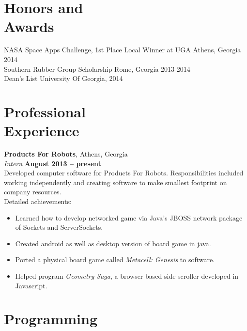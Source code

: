 \documentclass[margin,line]{resume}
\begin{document}
\begin{resume}
    \section{\mysidestyle Honors and\\Awards} 

   NASA Space Apps Challenge, 1st Place Local Winner at UGA \hfill Athens, Georgia 2014\\%
   Southern Rubber Group Scholarship \hfill Rome, Georgia 2013-2014\\%
   Dean's List \hfill University Of Georgia, 2014
   \section{\mysidestyle Professional\\Experience}

    \textbf{Products For Robots}, Athens, Georgia \vspace{2mm}\\\vspace{1mm}%
    \textsl{Intern} \hfill \textbf{August 2013 -- present}\\
   Developed computer software for Products For Robots. Responsibilities included working independently and creating software to make smallest footprint on company resources.\\
Detailed achievements:
\begin{itemize}
\item Learned how to develop networked game via Java's JBOSS network package of Sockets and ServerSockets.
\item Created android as well as desktop version of board game in java.
\item Ported a physical board game called \textit{Metacell: Genesis} to software.
\item Helped program \textit{Geometry Saga}, a browser based side scroller developed in Javascript.
\end{itemize}


    \section{\mysidestyle Programming} 


\end{resume}
\end{document}
